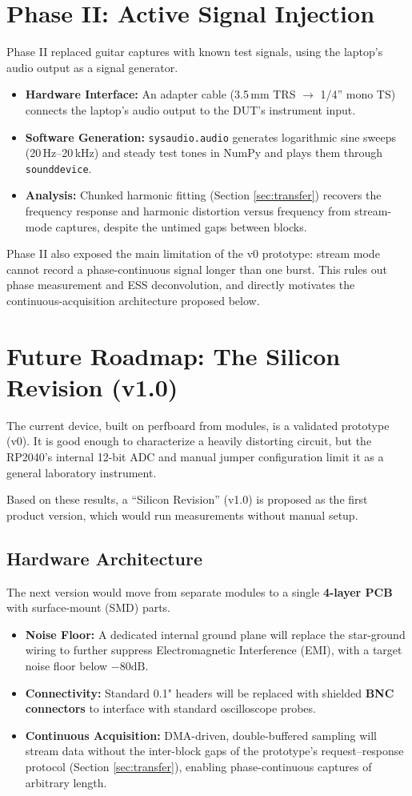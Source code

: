 \documentclass[11pt, a4paper]{report}
\begin{document}
\section{Phase II: Active Signal Injection}
\label{sec:phase2}
Phase II replaced guitar captures with known test signals, using the laptop's audio output as a signal generator.
\begin{itemize}
  \item \textbf{Hardware Interface:} An adapter cable (3.5\,mm TRS $\to$ 1/4'' mono TS) connects the laptop's audio output to the DUT's instrument input.
  \item \textbf{Software Generation:} \texttt{sysaudio.audio} generates logarithmic sine sweeps (20\,Hz--20\,kHz) and steady test tones in NumPy and plays them through \texttt{sounddevice}.
  \item \textbf{Analysis:} Chunked harmonic fitting (Section \ref{sec:transfer}) recovers the frequency response and harmonic distortion versus frequency from stream-mode captures, despite the untimed gaps between blocks.
\end{itemize}

Phase II also exposed the main limitation of the v0 prototype: stream mode cannot record a phase-continuous signal longer than one burst. This rules out phase measurement and ESS deconvolution, and directly motivates the continuous-acquisition architecture proposed below.

\section{Future Roadmap: The Silicon Revision (v1.0)}
The current device, built on perfboard from modules, is a validated prototype (v0). It is good enough to characterize a heavily distorting circuit, but the RP2040's internal 12-bit ADC and manual jumper configuration limit it as a general laboratory instrument.

Based on these results, a ``Silicon Revision'' (v1.0) is proposed as the first product version, which would run measurements without manual setup.

\subsection{Hardware Architecture}
The next version would move from separate modules to a single \textbf{4-layer PCB} with surface-mount (SMD) parts.
\begin{itemize}
  \item \textbf{Noise Floor:} A dedicated internal ground plane will replace the star-ground wiring to further suppress Electromagnetic Interference (EMI), with a target noise floor below $-80\text{dB}$.
  \item \textbf{Connectivity:} Standard 0.1" headers will be replaced with shielded \textbf{BNC connectors} to interface with standard oscilloscope probes.
  \item \textbf{Continuous Acquisition:} DMA-driven, double-buffered sampling will stream data without the inter-block gaps of the prototype's request--response protocol (Section \ref{sec:transfer}), enabling phase-continuous captures of arbitrary length.
\end{itemize}
\end{document}
